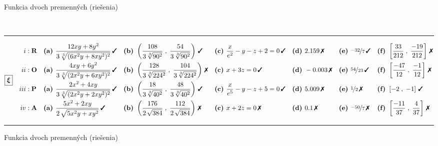 \documentclass[10pt]{report}
\begin{document}
\begin{landscape}
\begin{center}{\huge \LARGE Funkcia dvoch premenných (riešenia)}
\begin{varwidth}{\linewidth}
\begin{center}
\\[2mm]
\rule[1mm]{\linewidth}{0.5pt}
$\boxed{\bm{\xi}} \quad \begin{aligned}
\romannumeral1 : \; &\textbf{R} 
 &&\mathrm{\textbf{(a) }} \frac{12xy+8y^2}{3\,\sqrt[3]{(6x^2y+8xy^2)^{2}}}\,\text{\ding{51}}
 &&\mathrm{\textbf{(b) }} \left( \frac{108}{3\,\sqrt[3]{90^2}} \;,\; \frac{54}{3\,\sqrt[3]{90^2}} \right)\,\text{\ding{51}}
 &&\mathrm{\textbf{(c) }} \frac{x}{e^2} - y - z + 2 = 0\,\text{\ding{51}}
 &&\mathrm{\textbf{(d) }} 2.159\,\text{\ding{55}}
 &&\mathrm{\textbf{(e) }} \nicefrac{-32}{7}\,\text{\ding{51}}
 &&\mathrm{\textbf{(f) }} \left[\frac{33}{212}\;,\;\frac{-19}{212}\right]\,\text{\ding{55}}
\\[-0.4mm]
\romannumeral2 : \; &\textbf{O} 
 &&\mathrm{\textbf{(a) }} \frac{4xy+6y^2}{3\,\sqrt[3]{(2x^2y+6xy^2)^{2}}}\,\text{\ding{51}}
 &&\mathrm{\textbf{(b) }} \left( \frac{128}{3\,\sqrt[3]{224^2}} \;,\; \frac{104}{3\,\sqrt[3]{224^2}} \right)\,\text{\ding{55}}
 &&\mathrm{\textbf{(c) }} x+3z=0\,\text{\ding{51}}
 &&\mathrm{\textbf{(d) }} -0.003\,\text{\ding{55}}
 &&\mathrm{\textbf{(e) }} \nicefrac{54}{23}\,\text{\ding{51}}
 &&\mathrm{\textbf{(f) }} \left[\frac{-47}{12}\;,\;\frac{-1}{12}\right]\,\text{\ding{55}}
\\[-0.4mm]
\romannumeral3 : \; &\textbf{P} 
 &&\mathrm{\textbf{(a) }} \frac{2x^2+4xy}{3\,\sqrt[3]{(2x^2y+2xy^2)^{2}}}\,\text{\ding{51}}
 &&\mathrm{\textbf{(b) }} \left( \frac{18}{3\,\sqrt[3]{40^2}} \;,\; \frac{48}{3\,\sqrt[3]{40^2}} \right)\,\text{\ding{51}}
 &&\mathrm{\textbf{(c) }} \frac{x}{e^5} - y - z + 5 = 0\,\text{\ding{51}}
 &&\mathrm{\textbf{(d) }} 5.009\,\text{\ding{55}}
 &&\mathrm{\textbf{(e) }} \nicefrac{1}{2}\,\text{\ding{55}}
 &&\mathrm{\textbf{(f) }} \left[-2\;,\;-1\right]\,\text{\ding{51}}
\\[-0.4mm]
\romannumeral4 : \; &\textbf{A} 
 &&\mathrm{\textbf{(a) }} \frac{5x^2+2xy}{2\,\sqrt{5x^2y+xy^2}}\,\text{\ding{51}}
 &&\mathrm{\textbf{(b) }} \left( \frac{176}{2\,\sqrt{384}} \;,\; \frac{112}{2\,\sqrt{384}} \right)\,\text{\ding{55}}
 &&\mathrm{\textbf{(c) }} x+2z=0\,\text{\ding{55}}
 &&\mathrm{\textbf{(d) }} 0.1\,\text{\ding{55}}
 &&\mathrm{\textbf{(e) }} \nicefrac{-50}{7}\,\text{\ding{55}}
 &&\mathrm{\textbf{(f) }} \left[\frac{-11}{37}\;,\;\frac{4}{37}\right]\,\text{\ding{55}}
\end{aligned} $
\\[2mm]
\rule[1mm]{\linewidth}{0.5pt}
\end{center}\end{varwidth}\end{center}\clearpage\begin{center}{\huge \LARGE Funkcia dvoch premenných (riešenia)}\\[4mm]\begin{varwidth}{\linewidth}\begin{center}

\end{center}
\end{varwidth}
\end{center}
\end{landscape}
\end{document}
